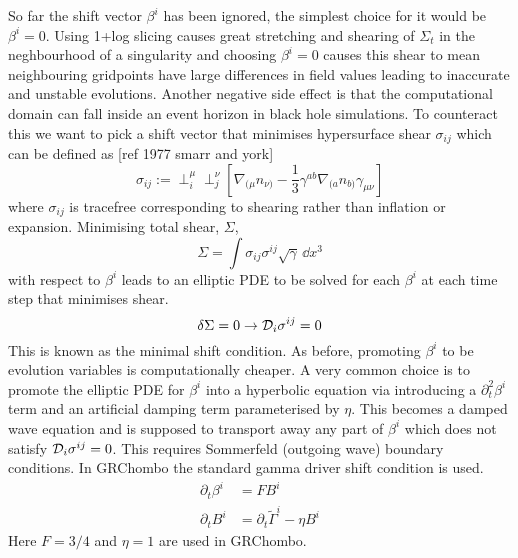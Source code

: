 So far the shift vector $\beta^i$ has been ignored, the simplest choice for it would be $\beta^i=0$. Using 1+log slicing causes great stretching and shearing of $\Sigma_t$ in the neghbourhood of a singularity and choosing $\beta^i=0$ causes this shear to mean neighbouring gridpoints have large differences in field values leading to inaccurate and unstable evolutions. Another negative side effect is that the computational domain can fall inside an event horizon in black hole simulations. To counteract this we want to pick a shift vector that minimises hypersurface shear $\sigma_{ij}$ which can be defined as [ref 1977 smarr and york]
\[ \sigma_{ij}:= \perp^\mu_i \perp^\nu_j \left[\nabla_{(\mu} n_{\nu)}-\frac{1}{3}\gamma^{ab}\nabla_{(a} n_{b)} \gamma_{\mu\nu}\right] \]
where $\sigma_{ij}$ is tracefree corresponding to shearing rather than inflation or expansion. Minimising total shear, $\Sigma$,
\[ \Sigma = \int \sigma_{ij}\sigma^{ij}\sqrt{\gamma}\,\dd x^3\]
with respect to $\beta^i$ leads to an elliptic PDE to be solved for each $\beta^i$ at each time step that minimises shear. 
\[ \delta \Sigma = 0 \rightarrow \mathcal{D}_i\sigma^{ij}=0\]
This is known as the minimal shift condition. As before, promoting $\beta^i$ to be evolution variables is computationally cheaper. A very common choice is to promote the elliptic PDE for $\beta^i$ into a hyperbolic equation via introducing a $\partial_t^2\beta^i$ term and an artificial damping term parameterised by $\eta$. This becomes a damped wave equation and is supposed to transport away any part of $\beta^i$ which does not satisfy $\mathcal{D}_i \sigma^{ij}=0$. This requires Sommerfeld (outgoing wave) boundary conditions. In GRChombo the standard gamma driver shift condition is used.
\begin{align} \partial_t \beta^i &= FB^i\\
 \partial_t B^i &= \partial_t \tilde{\Gamma}^i - \eta B^i\end{align}
Here $F=3/4$ and $\eta=1$ are used in GRChombo.





